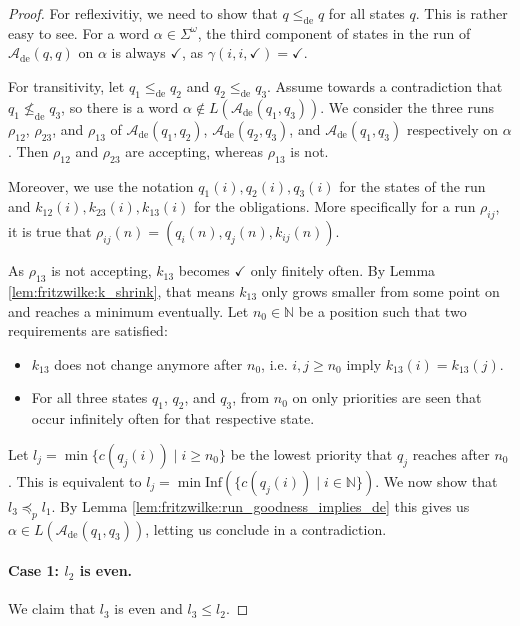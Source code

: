\begin{proof}
	For reflexivitiy, we need to show that $q \leq_\text{de} q$ for all states $q$. This is rather easy to see. For a word $\alpha \in \Sigma^\omega$, the third component of states in the run of $\mathcal{A}_\text{de}(q, q)$ on $\alpha$ is always $\checkmark$, as $\gamma(i, i, \checkmark) = \checkmark$.
	
	For transitivity, let $q_1 \leq_\text{de} q_2$ and $q_2 \leq_\text{de} q_3$. Assume towards a contradiction that $q_1 \not\leq_\text{de} q_3$, so there is a word $\alpha \notin L(\mathcal{A}_\text{de}(q_1, q_3))$. We consider the three runs $\rho_{12}$, $\rho_{23}$, and $\rho_{13}$ of $\mathcal{A}_\text{de}(q_1, q_2)$, $\mathcal{A}_\text{de}(q_2, q_3)$, and $\mathcal{A}_\text{de}(q_1, q_3)$ respectively on $\alpha$. Then $\rho_{12}$ and $\rho_{23}$ are accepting, whereas $\rho_{13}$ is not. 
	
	Moreover, we use the notation $q_1(i), q_2(i), q_3(i)$ for the states of the run and $k_{12}(i), k_{23}(i), k_{13}(i)$ for the obligations. More specifically for a run $\rho_{ij}$, it is true that $\rho_{ij}(n) = (q_i(n), q_j(n), k_{ij}(n))$.
	
	As $\rho_{13}$ is not accepting, $k_{13}$ becomes $\checkmark$ only finitely often. By Lemma \ref{lem:fritzwilke:k_shrink}, that means $k_{13}$ only grows smaller from some point on and reaches a minimum eventually. Let $n_0 \in \mathbb{N}$ be a position such that two requirements are satisfied:
	\begin{itemize}
		\item $k_{13}$ does not change anymore after $n_0$, i.e. $i,j \geq n_0$ imply $k_{13}(i) = k_{13}(j)$.
		\item For all three states $q_1$, $q_2$, and $q_3$, from $n_0$ on only priorities are seen that occur infinitely often for that respective state.
	\end{itemize}
	
	Let $l_j = \min \{ c(q_j(i)) \mid i \geq n_0 \}$ be the lowest priority that $q_j$ reaches after $n_0$.	This is equivalent to $l_j = \min \text{Inf}(\{ c(q_j(i)) \mid i \in \mathbb{N}\})$. We now show that $l_3 \preceq_p l_1$. By Lemma \ref{lem:fritzwilke:run_goodness_implies_de} this gives us $\alpha \in L(\mathcal{A}_\text{de}(q_1, q_3))$, letting us conclude in a contradiction.
	
	\paragraph{Case 1: $l_2$ is even.} We claim that $l_3$ is even and $l_3 \leq l_2$. 
	

\end{proof}
